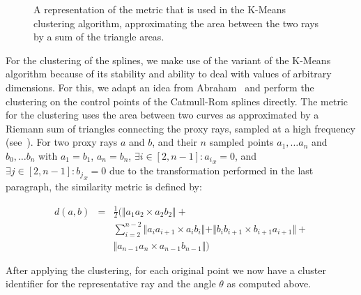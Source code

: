 \begin{figure}
\centering
{}
\caption{A representation of the metric that is used in the K-Means clustering algorithm, approximating the area between the two rays by a sum of the triangle areas.}
\label{contributions:fem:metric}
\end{figure}
\cite{meyer2009voreen}
For the clustering of the splines, we make use of the variant of the K-Means~\cite{hartigan75kmeans} algorithm because of its stability and ability to deal with values of arbitrary dimensions.  For this, we adapt an idea from Abraham~\etal \cite{abraham03clustering} and perform the clustering on the control points of the Catmull-Rom splines directly.  The metric for the clustering uses the area between two curves as approximated by a Riemann sum of triangles connecting the proxy rays, sampled at a high frequency (see~).  For two proxy rays $a$ and $b$, and their $n$ sampled points $a_1, \dots a_n$ and $b_0, \dots b_n$ with $a_1 = b_1$, $a_n = b_n$, $\exists i\in[2, n-1] : a{_i}_x = 0$, and $\exists j\in[2, n-1] : b{_j}_x = 0$ due to the transformation performed in the last paragraph, the similarity metric is defined by:

\begin{eqnarray}
d(a,b) &=& \frac{1}{2} \Big( \Vert a_1a_2 \times a_2b_2\Vert + \nonumber \\
&& \sum_{i=2}^{n-2}\Vert a_ia_{i+1} \times a_ib_i \Vert + \Vert b_ib_{i+1} \times b_{i+1}a_{i+1}\Vert + \\
&& \Vert a_{n-1}a_n \times a_{n-1}b_{n-1}\Vert \Big) \nonumber 
\end{eqnarray}

After applying the clustering, for each original point we now have a cluster identifier for the representative ray and the angle $\theta$ as computed above.



